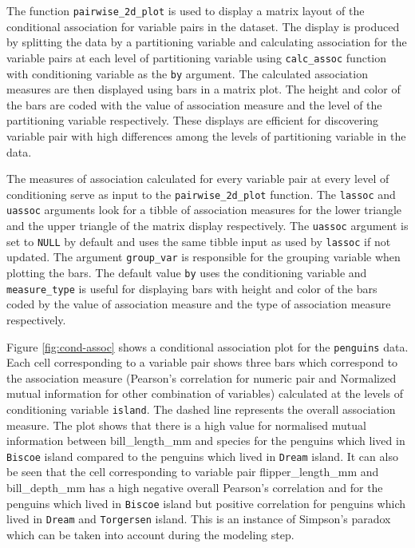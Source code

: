 The function \texttt{pairwise\_2d\_plot} is used to display a matrix
layout of the conditional association for variable pairs in the dataset.
The display is produced by splitting the data by a partitioning variable
and calculating association for the variable pairs at each level of
partitioning variable using \texttt{calc\_assoc} function with
conditioning variable as the \texttt{by} argument. The calculated
association measures are then displayed using bars in a matrix plot. The
height and color of the bars are coded with the value of association
measure and the level of the partitioning variable respectively. These
displays are efficient for discovering variable pair with high
differences among the levels of partitioning variable in the data.

The measures of association calculated for every variable pair at every
level of conditioning serve as input to the \texttt{pairwise\_2d\_plot}
function. The \texttt{lassoc} and \texttt{uassoc} arguments look for a
tibble of association measures for the lower triangle and the upper
triangle of the matrix display respectively. The \texttt{uassoc}
argument is set to \texttt{NULL} by default and uses the same tibble
input as used by \texttt{lassoc} if not updated. The argument
\texttt{group\_var} is responsible for the grouping variable when
plotting the bars. The default value \texttt{by} uses the conditioning
variable and \texttt{measure\_type} is useful for displaying bars with
height and color of the bars coded by the value of association measure
and the type of association measure respectively.

Figure \ref{fig:cond-assoc} shows a conditional association plot for the
\texttt{penguins} data. Each cell corresponding to a variable pair shows
three bars which correspond to the association measure (Pearson's
correlation for numeric pair and Normalized mutual information for other
combination of variables) calculated at the levels of conditioning
variable \texttt{island}. The dashed line represents the overall
association measure. The plot shows that there is a high value for
normalised mutual information between bill\_length\_mm and species for
the penguins which lived in \texttt{Biscoe} island compared to the
penguins which lived in \texttt{Dream} island. It can also be seen that
the cell corresponding to variable pair flipper\_length\_mm and
bill\_depth\_mm has a high negative overall Pearson's correlation and
for the penguins which lived in \texttt{Biscoe} island but positive
correlation for penguins which lived in \texttt{Dream} and
\texttt{Torgersen} island. This is an instance of Simpson's paradox
which can be taken into account during the modeling step.

